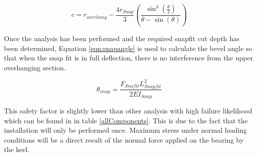 \documentclass[../main.tex]{subfiles}
\begin{document}
 \begin{equation}
 \label{eqn:centroid}
 c = r_{overhang} - \frac{4r_{Snap}}{3}\left(\frac{\sin^3\left(\frac{\theta}{2}\right)} {\theta-\sin(\theta)}\right)
 \end{equation}

Once the analysis has been performed and the required snapfit cut depth has been determined, Equation \ref{eqn:snapangle} is used to calculate the bevel angle so that when the snap fit is in full deflection, there is no interference from the upper overhanging section. 

\begin{equation}
\label{eqn:snapangle}
\theta_{snap} = \frac{F_{Snafit}L_{Snapfit}^2}{2EI_{Snap}}  
\end{equation}

This safety factor is slightly lower than other analysis with high failure likelihood which can be found in in table \ref{allComponents}. This is due to the fact that the installation will only be performed once. Maximum stress under normal loading conditions will be a direct result of the normal force applied on the bearing by the keel.
\end{document}
